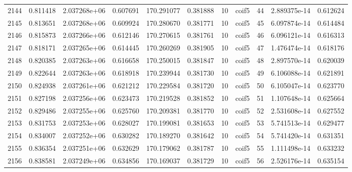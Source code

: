 \begin{tabular}{lrrrrrrlrrr}
2144 &    0.811418 &        2.037268e+06 &  0.607691 &              170.291077 &    0.381888 &      10 &        coif5 &     44 &   2.889375e-14 &      0.612624 \\
2145 &    0.813651 &        2.037268e+06 &  0.609924 &              170.280670 &    0.381771 &      10 &        coif5 &     45 &   6.097874e-14 &      0.614484 \\
2146 &    0.815873 &        2.037266e+06 &  0.612146 &              170.270615 &    0.381761 &      10 &        coif5 &     46 &   6.096121e-14 &      0.616313 \\
2147 &    0.818171 &        2.037265e+06 &  0.614445 &              170.260269 &    0.381905 &      10 &        coif5 &     47 &   1.476474e-14 &      0.618176 \\
2148 &    0.820385 &        2.037263e+06 &  0.616658 &              170.250015 &    0.381847 &      10 &        coif5 &     48 &   2.897570e-14 &      0.620039 \\
2149 &    0.822644 &        2.037263e+06 &  0.618918 &              170.239944 &    0.381730 &      10 &        coif5 &     49 &   6.106088e-14 &      0.621891 \\
2150 &    0.824938 &        2.037261e+06 &  0.621212 &              170.229584 &    0.381720 &      10 &        coif5 &     50 &   6.105047e-14 &      0.623770 \\
2151 &    0.827198 &        2.037256e+06 &  0.623473 &              170.219528 &    0.381852 &      10 &        coif5 &     51 &   1.107648e-14 &      0.625664 \\
2152 &    0.829486 &        2.037255e+06 &  0.625760 &              170.209381 &    0.381770 &      10 &        coif5 &     52 &   2.531608e-14 &      0.627552 \\
2153 &    0.831753 &        2.037253e+06 &  0.628027 &              170.199081 &    0.381653 &      10 &        coif5 &     53 &   5.741513e-14 &      0.629477 \\
2154 &    0.834007 &        2.037252e+06 &  0.630282 &              170.189270 &    0.381642 &      10 &        coif5 &     54 &   5.741420e-14 &      0.631351 \\
2155 &    0.836354 &        2.037251e+06 &  0.632629 &              170.179062 &    0.381787 &      10 &        coif5 &     55 &   1.111498e-14 &      0.633232 \\
2156 &    0.838581 &        2.037249e+06 &  0.634856 &              170.169037 &    0.381729 &      10 &        coif5 &     56 &   2.526176e-14 &      0.635154 \\

\end{tabular}
